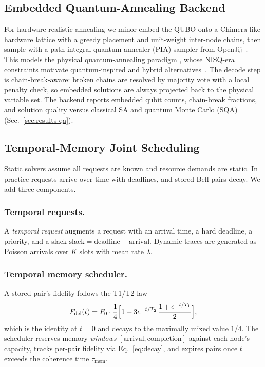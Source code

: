 \documentclass[10pt,a4paper]{article}
\begin{document}
\subsection{Embedded Quantum-Annealing Backend}
\label{sec:qa}

For hardware-realistic annealing we minor-embed the QUBO onto a
Chimera-like hardware lattice with a greedy placement and unit-weight
inter-node chains, then sample with a path-integral quantum annealer
(PIA) sampler from OpenJij~\cite{openjij,venegas2018quantum}.  This
models the physical quantum-annealing paradigm
\cite{kadowaki1998quantum,johnson2011quantum,boixo2014evidence},
whose NISQ-era constraints motivate quantum-inspired and hybrid
alternatives~\cite{preskill2018nisq,tanahashi2019application,farhi2014qaoa}.
The
decode step is chain-break-aware: broken chains are resolved by
majority vote with a local penalty check, so embedded solutions are
always projected back to the physical variable set.  The backend
reports embedded qubit counts, chain-break fractions, and solution
quality versus classical SA and quantum Monte Carlo (SQA)
(Sec.~\ref{sec:results-qa}).

\subsection{Temporal-Memory Joint Scheduling}
\label{sec:joint}

Static solvers assume all requests are known and resource demands are
static.  In practice requests arrive over time with deadlines, and
stored Bell pairs decay.  We add three components.

\subsubsection{Temporal requests.}
A \emph{temporal request} augments a request with an arrival time, a
hard deadline, a priority, and a slack
$\text{slack} = \text{deadline} - \text{arrival}$.  Dynamic traces are
generated as Poisson arrivals over $K$ slots with mean rate $\lambda$.

\subsubsection{Temporal memory scheduler.}
A stored pair's fidelity follows the T1/T2 law
\begin{equation}
  \label{eq:decay}
  F_{\text{del}}(t) = F_0 \cdot \frac{1}{4}
    \Bigl[1 + 3 e^{-t/T_2}\,\frac{1 + e^{-t/T_1}}{2}\Bigr],
\end{equation}
which is the identity at $t=0$ and decays to the maximally mixed value
$1/4$.  The scheduler reserves memory \emph{windows}
$[\text{arrival},\text{completion}]$ against each node's capacity,
tracks per-pair fidelity via Eq.~\eqref{eq:decay}, and expires pairs
once $t$ exceeds the coherence time $\tau_{\text{mem}}$.
\end{document}
